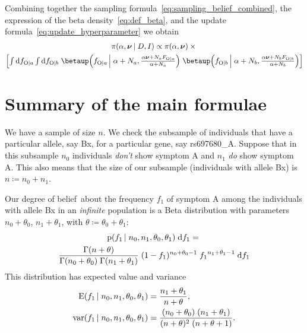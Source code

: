 \documentclass[\ifafour a4paper,12pt,\else a5paper,10pt,\fi%
onecolumn,oneside,article,%
british%
]{memoir}
\theoremstyle{remark}
\theoremstyle{innote}
\newcommand*{\di}{\mathrm{d}}%
\newcommand*{\defd}{\coloneqq}
\newcommand*{\pf}{\mathrm{p}}%
\newcommand*{\E}{\mathrm{E}}
\renewcommand*{\|}[1][]{\nonscript\,#1\vert\nonscript\;\mathopen{}}
\newcommand*{\tint}{\begingroup\textstyle\int\endgroup\nolimits}
\newcommand*{\dob}{degree of belief}
\DeclareMathOperator{\var}{var}
\newcommand*{\yD}{D}
\newcommand*{\yI}{I}
\newcommand*{\ya}{a}
\newcommand*{\yb}{b}
\newcommand*{\ysA}{\textrm{O}}%
\newcommand*{\dbeta}{\betaup}
\newcommand*{\dA}{\pi}
\newcommand*{\yA}{\alpha}
\newcommand*{\yqq}{\nu}
\newcommand*{\yq}{\bm{\yqq}}
\begin{document}
Combining together the sampling
formula~\eqref{eq:sampling_belief_combined}, the expression of the beta
density~\eqref{eq:def_beta}, and the update
formula~\eqref{eq:update_hyperparameter} we obtain
\begin{multline}
  \label{eq:parameter_posterior_first}
  \dA(\yA,\yq \|\yD, \yI) \propto
    \dA(\yA,\yq) \times{}\\
  \Bigl[   \tint\di f_{\ysA\|\ya}\tint\di f_{\ysA\|\yb}\;
  \dbeta\Bigl(f_{\ysA\|\ya} \|[\Big] \yA+N_{\ya},
  \frac{\yA\yq+N_{\ya}F_{\ysA\|\ya}}{\yA+N_{\ya}}
    \Bigl)\;
  \dbeta\Bigl(f_{\ysA\|\yb} \|[\Big] \yA+N_{\yb},
  \frac{\yA\yq+N_{\yb}F_{\ysA\|\yb}}{\yA+N_{\yb}}
    \Bigr)
       \Bigr]
\end{multline}


\section{Summary of the main formulae}

We have a sample of size $n$. We check the subsample of individuals that
have a particular allele, say Bx, for a particular gene, say rs697680\_A.
Suppose that in this subsample $n_0$ individuals \emph{don't} show symptom
A and $n_1$ \emph{do} show symptom A. This also means that the size of our
subsample (individuals with allele Bx) is $n \defd n_0+n_1$.

Our \dob\ about the frequency $f_1$ of symptom A among the individuals with
allele Bx in an \emph{infinite} population is a Beta distribution with
parameters $n_0+\theta_0$, $n_1+\theta_1$, with
$\theta \defd \theta_0+\theta_1$:
\begin{multline}
  \label{eq:beta_fr}
  \pf(f_1 \| n_0,n_1,\theta_0,\theta_1)\;\di f_1 ={}\\
  \frac{\Gamma(n+\theta)}{\Gamma(n_0+\theta_0)\;\Gamma(n_1+\theta_1)}
  \; (1-f_1)^{n_0+\theta_0-1}\;{f_1}^{n_1+\theta_1-1} \;\di f_1
\end{multline}
This distribution has expected value and variance
\begin{equation}
  \label{eq:exp_value}
  \begin{split}
  \E(f_1 \| n_0, n_1, \theta_0,\theta_1) &= \frac{n_1+\theta_1}{n+\theta},
  \\
  \var(f_1 \|  n_0, n_1, \theta_0,\theta_1) &=
  \frac{(n_0+\theta_0)\;(n_1+\theta_1)}{(n+\theta)^2\;(n+\theta+1)}.
\end{split}
\end{equation}
\end{document}
